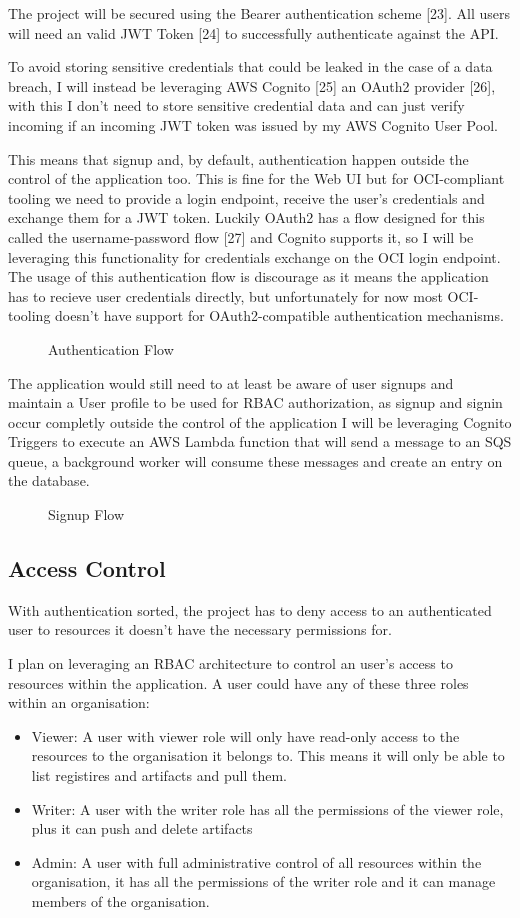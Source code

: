 \documentclass{article}
\newcommand{\widefig}[3][1.2\textwidth]{%
  \begin{figure}[H]
    \makebox[\textwidth][c]{%
      \texttt{[image: \#2]}%
    }
    \caption{#3}
  \end{figure}
}
\begin{document}
  The project will be secured using the Bearer authentication scheme [23]. All users will need an valid JWT Token [24] to successfully authenticate against the API.

  To avoid storing sensitive credentials that could be leaked in the case of a data breach, I will instead be leveraging AWS Cognito [25] an OAuth2 provider [26], with this I don't need to store sensitive credential data and can just verify incoming if an incoming JWT token was issued by my AWS Cognito User Pool.

  This means that signup and, by default, authentication happen outside the control of the application too. This is fine for the Web UI but for OCI-compliant tooling we need to provide a login endpoint, receive the user's credentials and exchange them for a JWT token. Luckily OAuth2 has a flow designed for this called the username-password flow [27] and Cognito supports it, so I will be leveraging this functionality for credentials exchange on the OCI login endpoint. The usage of this authentication flow is discourage as it means the application has to recieve user credentials directly, but unfortunately for now most OCI-tooling doesn't have support for OAuth2-compatible authentication mechanisms.

  \widefig{appendix/auth-flow.png}{Authentication Flow}

  The application would still need to at least be aware of user signups and maintain a User profile to be used for RBAC authorization, as signup and signin occur completly outside the control of the application I will be leveraging Cognito Triggers to execute an AWS Lambda function that will send a message to an SQS queue, a background worker will consume these messages and create an entry on the database.

  \widefig{appendix/signup-flow.png}{Signup Flow}
  
  \subsection{Access Control}

  With authentication sorted, the project has to deny access to an authenticated user to resources it doesn't have the necessary permissions for.

  I plan on leveraging an RBAC architecture to control an user's access to resources within the application. A user could have any of these three roles within an organisation:
  \begin{itemize}
    \item Viewer: A user with viewer role will only have read-only access to the resources to the organisation it belongs to. This means it will only be able to list registires and artifacts and pull them.
    \item Writer: A user with the writer role has all the permissions of the viewer role, plus it can push and delete artifacts
    \item Admin: A user with full administrative control of all resources within the organisation, it has all the permissions of the writer role and it can manage members of the organisation.
  \end{itemize}
\end{document}
